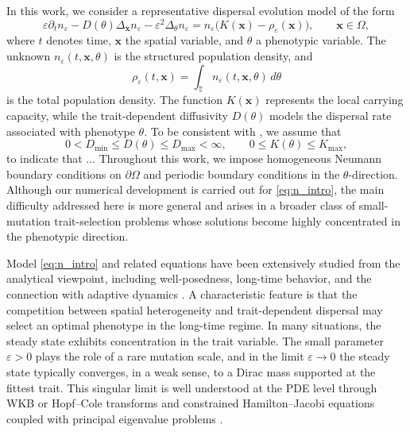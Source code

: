 \documentclass[11pt, dina4, amsfont12]{article}
\begin{document}
In this work, we consider a representative dispersal evolution model of the form
\begin{equation}\label{eq:n_intro}
    \varepsilon \partial_t n_\varepsilon
    -D(\theta)\Delta_\mathbf{x} n_\varepsilon
    -\varepsilon^2\Delta_\theta n_\varepsilon
    =
    n_\varepsilon\bigl(K(\mathbf{x})-\rho_\varepsilon(\mathbf{x})\bigr),
    \qquad \mathbf{x}\in\Omega,
\end{equation}
where $t$ denotes time, $\mathbf{x}$ the spatial variable, and $\theta$ a phenotypic variable. The unknown $n_\varepsilon(t,\mathbf{x},\theta)$ is the structured population density, and
\[
\rho_\varepsilon(t,\mathbf{x})
=
\int_{\mathbb T} n_\varepsilon(t,\mathbf{x},\theta)\,d\theta
\]
is the total population density. The function $K(\mathbf{x})$ represents the local carrying capacity, while the trait-dependent diffusivity $D(\theta)$ models the dispersal rate associated with phenotype $\theta$. 
To be consistent with \cite{}, we assume that
\[
    0<D_{\min}\le D(\theta)\le D_{\max}<\infty,
    \qquad
    0\le K(\theta)\le K_{\max}, 
\]
{\color{red}to indicate that ...}
Throughout this work, we impose homogeneous Neumann boundary conditions on $\partial\Omega$ and periodic boundary conditions in the $\theta$-direction. Although our numerical development is carried out for \eqref{eq:n_intro}, the main difficulty addressed here is more general and arises in a broader class of small-mutation trait-selection problems whose solutions become highly concentrated in the phenotypic direction.

Model \eqref{eq:n_intro} and related equations have been extensively studied from the analytical viewpoint, including well-posedness, long-time behavior, and the connection with adaptive dynamics \cite{MirrahimiPerthame,PerthameSouganidis,AlmeidaPerthameRuan}. A characteristic feature is that the competition between spatial heterogeneity and trait-dependent dispersal may select an optimal phenotype in the long-time regime. In many situations, the steady state exhibits concentration in the trait variable. The small parameter $\varepsilon>0$ plays the role of a rare mutation scale, and in the limit $\varepsilon\to0$ the steady state typically converges, in a weak sense, to a Dirac mass supported at the fittest trait. This singular limit is well understood at the PDE level through WKB or Hopf--Cole transforms and constrained Hamilton--Jacobi equations coupled with principal eigenvalue problems \cite{PerthameSouganidis,BarlesPerthame,MirrahimiPerthame}.
\end{document}
